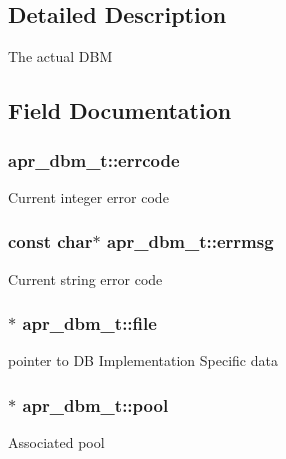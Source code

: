 \subsection{Detailed Description}
The actual D\+BM 

\subsection{Field Documentation}
\subsubsection[{\texorpdfstring{errcode}{errcode}}]{ apr\+\_\+dbm\+\_\+t\+::errcode}\hypertarget{structapr__dbm__t_a130a628921f4c46241d09476f8a3090c}{}\label{structapr__dbm__t_a130a628921f4c46241d09476f8a3090c}
Current integer error code 
\subsubsection[{\texorpdfstring{errmsg}{errmsg}}]{\setlength{\rightskip}{0pt plus 5cm}const char$\ast$ apr\+\_\+dbm\+\_\+t\+::errmsg}\hypertarget{structapr__dbm__t_adc3defc90b90fe3411c099631f75a653}{}\label{structapr__dbm__t_adc3defc90b90fe3411c099631f75a653}
Current string error code 
\subsubsection[{\texorpdfstring{file}{file}}]{$\ast$ apr\+\_\+dbm\+\_\+t\+::file}\hypertarget{structapr__dbm__t_a228e2548b3a034d8d16451af4b93f3f1}{}\label{structapr__dbm__t_a228e2548b3a034d8d16451af4b93f3f1}
pointer to DB Implementation Specific data 
\subsubsection[{\texorpdfstring{pool}{pool}}]{$\ast$ apr\+\_\+dbm\+\_\+t\+::pool}\hypertarget{structapr__dbm__t_af80b38e28d1504e98f9aa3308285bf9b}{}\label{structapr__dbm__t_af80b38e28d1504e98f9aa3308285bf9b}
Associated pool 
